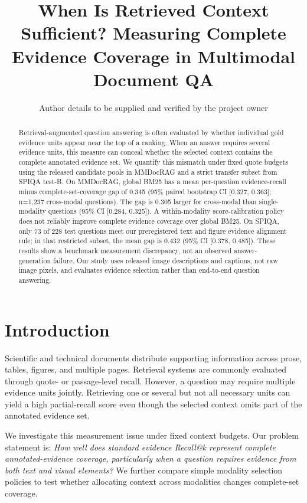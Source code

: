 \documentclass[11pt]{article}
\title{When Is Retrieved Context Sufficient? Measuring Complete Evidence Coverage in Multimodal Document QA}
\author{Author details to be supplied and verified by the project owner}
\date{}
\begin{document}
\maketitle

\begin{abstract}
Retrieval-augmented question answering is often evaluated by whether individual gold evidence units appear near the top of a ranking. When an answer requires several evidence units, this measure can conceal whether the selected context contains the complete annotated evidence set. We quantify this mismatch under fixed quote budgets using the released candidate pools in MMDocRAG and a strict transfer subset from SPIQA test-B. On MMDocRAG, global BM25 has a mean per-question evidence-recall minus complete-set-coverage gap of 0.345 (95\% paired bootstrap CI [0.327, 0.363]; n=1,237 cross-modal questions). The gap is 0.305 larger for cross-modal than single-modality questions (95\% CI [0.284, 0.325]). A within-modality score-calibration policy does not reliably improve complete evidence coverage over global BM25. On SPIQA, only 73 of 228 test questions meet our preregistered text and figure evidence alignment rule; in that restricted subset, the mean gap is 0.432 (95\% CI [0.378, 0.485]). These results show a benchmark measurement discrepancy, not an observed answer-generation failure. Our study uses released image descriptions and captions, not raw image pixels, and evaluates evidence selection rather than end-to-end question answering.
\end{abstract}

\section{Introduction}
Scientific and technical documents distribute supporting information across prose, tables, figures, and multiple pages. Retrieval systems are commonly evaluated through quote- or passage-level recall. However, a question may require multiple evidence units jointly. Retrieving one or several but not all necessary units can yield a high partial-recall score even though the selected context omits part of the annotated evidence set.

We investigate this measurement issue under fixed context budgets. Our problem statement is: \emph{How well does standard evidence Recall@k represent complete annotated-evidence coverage, particularly when a question requires evidence from both text and visual elements?} We further compare simple modality selection policies to test whether allocating context across modalities changes complete-set coverage.
\end{document}
